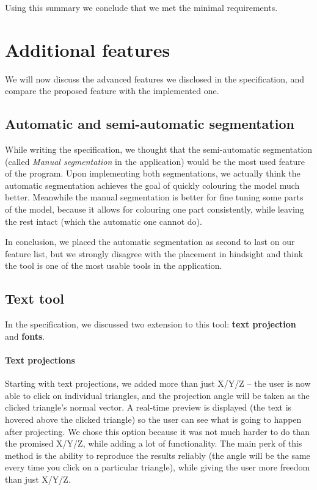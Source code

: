 Using this summary we conclude that we met the minimal requirements.

\section{Additional features}
\label{sec:features}

We will now discuss the advanced features we disclosed in the specification, and compare the proposed feature with the implemented one.

\subsection{Automatic and semi-automatic segmentation}

While writing the specification, we thought that the semi-automatic segmentation (called \textit{Manual segmentation} in the application) would be the most used feature of the program. Upon implementing both segmentations, we actually think the automatic segmentation achieves the goal of quickly colouring the model much better. Meanwhile the manual segmentation is better for fine tuning some parts of the model, because it allows for colouring one part consistently, while leaving the rest intact (which the automatic one cannot do).

In conclusion, we placed the automatic segmentation as second to last on our feature list, but we strongly disagree with the placement in hindsight and think the tool is one of the most usable tools in the application.

\subsection{Text tool}

In the specification, we discussed two extension to this tool: \textbf{text projection} and \textbf{fonts}.

\paragraph{Text projections}

Starting with text projections, we added more than just X/Y/Z -- the user is now able to click on individual triangles, and the projection angle will be taken as the clicked triangle's normal vector.
A real-time preview is displayed (the text is hovered above the clicked triangle) so the user can see what is going to happen after projecting.
We chose this option because it was not much harder to do than the promised X/Y/Z, while adding a lot of functionality.
The main perk of this method is the ability to reproduce the results reliably (the angle will be the same every time you click on a particular triangle), while giving the user more freedom than just X/Y/Z.

